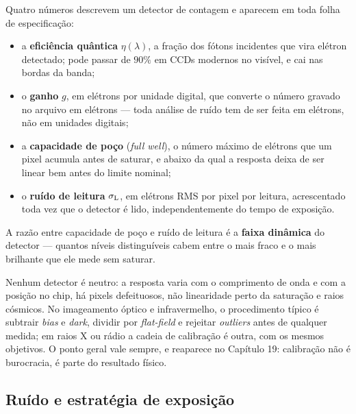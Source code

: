 \documentclass[11pt,a4paper]{article}
\begin{document}
Quatro números descrevem um detector de contagem e aparecem em toda folha de especificação:
\begin{itemize}
\item a \textbf{eficiência quântica} $\eta(\lambda)$, a fração dos fótons incidentes que vira elétron detectado;
pode passar de $90\%$ em CCDs modernos no visível, e cai nas bordas da banda;
\item o \textbf{ganho} $g$, em elétrons por unidade digital, que converte o número gravado no arquivo em elétrons
--- toda análise de ruído tem de ser feita em elétrons, não em unidades digitais;
\item a \textbf{capacidade de poço} (\textit{full well}), o número máximo de elétrons que um pixel acumula antes
de saturar, e abaixo da qual a resposta deixa de ser linear bem antes do limite nominal;
\item o \textbf{ruído de leitura} $\sigma_{\rm L}$, em elétrons RMS por pixel por leitura, acrescentado toda vez
que o detector é lido, independentemente do tempo de exposição.
\end{itemize}
A razão entre capacidade de poço e ruído de leitura é a \textbf{faixa dinâmica} do detector --- quantos níveis
distinguíveis cabem entre o mais fraco e o mais brilhante que ele mede sem saturar.

Nenhum detector é neutro: a resposta varia com o comprimento de onda e com a posição no chip, há pixels
defeituosos, não linearidade perto da saturação e raios cósmicos. No imageamento óptico e infravermelho, o
procedimento típico é subtrair \textit{bias} e \textit{dark}, dividir por \textit{flat-field} e rejeitar
\textit{outliers} antes de qualquer medida; em raios X ou rádio a cadeia de calibração é outra, com os mesmos
objetivos. O ponto geral vale sempre, e reaparece no Capítulo 19: calibração não é burocracia, é parte do
resultado físico.

\subsection*{Ruído e estratégia de exposição}
\end{document}
